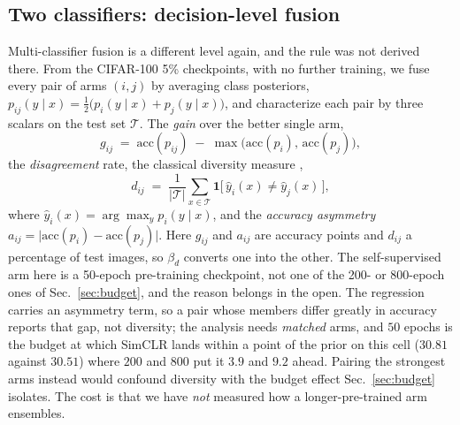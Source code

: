 \subsection{Two classifiers: decision-level fusion}\label{sec:decisionfusion}
Multi-classifier fusion is a different level again, and the rule was not
derived there. From the CIFAR-100 5\% checkpoints, with no further training, we
fuse every pair of arms $(i,j)$ by averaging class posteriors, $p_{ij}(y \mid
x) = \tfrac{1}{2}\bigl(p_i(y \mid x) + p_j(y \mid x)\bigr)$, and characterize
each pair by three scalars on the test set $\mathcal{T}$. The \emph{gain} over
the better single arm,
\begin{equation}
  g_{ij} \;=\; \mathrm{acc}(p_{ij}) \;-\; \max\bigl(\mathrm{acc}(p_i),\,
  \mathrm{acc}(p_j)\bigr),
  \label{eq:ensgaindef}
\end{equation}
the \emph{disagreement} rate, the classical diversity measure
\citep{brown2005diversity},
\begin{equation}
  d_{ij} \;=\; \frac{1}{|\mathcal{T}|} \sum_{x \in \mathcal{T}}
  \mathbf{1}\bigl[\, \hat{y}_i(x) \neq \hat{y}_j(x) \,\bigr],
  \label{eq:disagree}
\end{equation}
where $\hat{y}_i(x) = \arg\max_y p_i(y \mid x)$, and the \emph{accuracy
asymmetry} $a_{ij} = \lvert \mathrm{acc}(p_i) - \mathrm{acc}(p_j) \rvert$. Here
$g_{ij}$ and $a_{ij}$ are accuracy points and $d_{ij}$ a percentage of test
images, so $\beta_d$ converts one into the other. The self-supervised arm here
is a 50-epoch pre-training checkpoint, not one of the 200- or 800-epoch ones of
Sec.~\ref{sec:budget}, and the reason belongs in the open. The regression
carries an asymmetry term, so a pair whose members differ greatly in accuracy
reports that gap, not diversity; the analysis needs \emph{matched} arms,
and $50$ epochs is the budget at which SimCLR lands within a point of the prior
on this cell ($30.81$ against $30.51$) where $200$ and $800$ put it $3.9$ and
$9.2$ ahead. Pairing the strongest arms instead would confound diversity with
the budget effect Sec.~\ref{sec:budget} isolates. The cost is that we have
\emph{not} measured how a longer-pre-trained arm ensembles.

